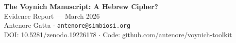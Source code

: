 \documentclass[11pt,a4paper]{article}
\begin{document}
\begin{center}
{\Huge\bfseries The Voynich Manuscript: A Hebrew Cipher?}\\[8pt]
{\Large\color{accent} Evidence Report --- March 2026}\\[12pt]
{\large Antenore Gatta $\cdot$ \texttt{antenore@simbiosi.org}}\\[4pt]
{\small DOI: \href{https://doi.org/10.5281/zenodo.19226178}{10.5281/zenodo.19226178}
\quad$\cdot$\quad
Code: \href{https://github.com/antenore/voynich-toolkit}{github.com/antenore/voynich-toolkit}}
\end{center}

\bigskip

\end{document}
